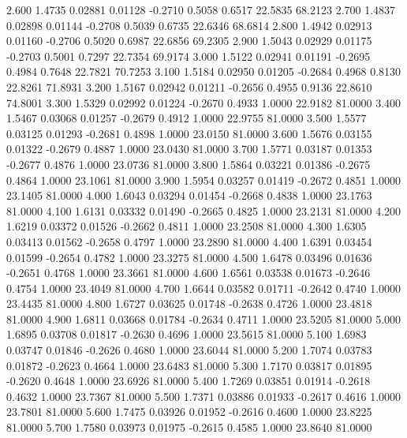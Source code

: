    2.600   1.4735   0.02881   0.01128  -0.2710   0.5058   0.6517  22.5835  68.2123
   2.700   1.4837   0.02898   0.01144  -0.2708   0.5039   0.6735  22.6346  68.6814
   2.800   1.4942   0.02913   0.01160  -0.2706   0.5020   0.6987  22.6856  69.2305
   2.900   1.5043   0.02929   0.01175  -0.2703   0.5001   0.7297  22.7354  69.9174
   3.000   1.5122   0.02941   0.01191  -0.2695   0.4984   0.7648  22.7821  70.7253
   3.100   1.5184   0.02950   0.01205  -0.2684   0.4968   0.8130  22.8261  71.8931
   3.200   1.5167   0.02942   0.01211  -0.2656   0.4955   0.9136  22.8610  74.8001
   3.300   1.5329   0.02992   0.01224  -0.2670   0.4933   1.0000  22.9182  81.0000
   3.400   1.5467   0.03068   0.01257  -0.2679   0.4912   1.0000  22.9755  81.0000
   3.500   1.5577   0.03125   0.01293  -0.2681   0.4898   1.0000  23.0150  81.0000
   3.600   1.5676   0.03155   0.01322  -0.2679   0.4887   1.0000  23.0430  81.0000
   3.700   1.5771   0.03187   0.01353  -0.2677   0.4876   1.0000  23.0736  81.0000
   3.800   1.5864   0.03221   0.01386  -0.2675   0.4864   1.0000  23.1061  81.0000
   3.900   1.5954   0.03257   0.01419  -0.2672   0.4851   1.0000  23.1405  81.0000
   4.000   1.6043   0.03294   0.01454  -0.2668   0.4838   1.0000  23.1763  81.0000
   4.100   1.6131   0.03332   0.01490  -0.2665   0.4825   1.0000  23.2131  81.0000
   4.200   1.6219   0.03372   0.01526  -0.2662   0.4811   1.0000  23.2508  81.0000
   4.300   1.6305   0.03413   0.01562  -0.2658   0.4797   1.0000  23.2890  81.0000
   4.400   1.6391   0.03454   0.01599  -0.2654   0.4782   1.0000  23.3275  81.0000
   4.500   1.6478   0.03496   0.01636  -0.2651   0.4768   1.0000  23.3661  81.0000
   4.600   1.6561   0.03538   0.01673  -0.2646   0.4754   1.0000  23.4049  81.0000
   4.700   1.6644   0.03582   0.01711  -0.2642   0.4740   1.0000  23.4435  81.0000
   4.800   1.6727   0.03625   0.01748  -0.2638   0.4726   1.0000  23.4818  81.0000
   4.900   1.6811   0.03668   0.01784  -0.2634   0.4711   1.0000  23.5205  81.0000
   5.000   1.6895   0.03708   0.01817  -0.2630   0.4696   1.0000  23.5615  81.0000
   5.100   1.6983   0.03747   0.01846  -0.2626   0.4680   1.0000  23.6044  81.0000
   5.200   1.7074   0.03783   0.01872  -0.2623   0.4664   1.0000  23.6483  81.0000
   5.300   1.7170   0.03817   0.01895  -0.2620   0.4648   1.0000  23.6926  81.0000
   5.400   1.7269   0.03851   0.01914  -0.2618   0.4632   1.0000  23.7367  81.0000
   5.500   1.7371   0.03886   0.01933  -0.2617   0.4616   1.0000  23.7801  81.0000
   5.600   1.7475   0.03926   0.01952  -0.2616   0.4600   1.0000  23.8225  81.0000
   5.700   1.7580   0.03973   0.01975  -0.2615   0.4585   1.0000  23.8640  81.0000
